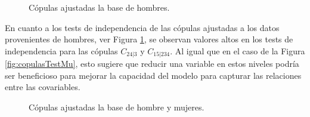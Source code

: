 \begin{figure}[H]
 \centering
    \caption{Cópulas ajustadas la base de hombres.}
    \label{fig:copulasTestHo}
\end{figure}

En cuanto a los tests de independencia de las cópulas ajustadas a los datos provenientes de hombres, ver Figura \ref{fig:copulasTestHo}, se observan valores altos en los tests de independencia para las cópulas $C_{24|3}$ y $C_{15|234}$. Al igual que en el caso de la Figura \ref{fig:copulasTestMu}, esto sugiere que reducir una variable en estos niveles podría ser beneficioso para mejorar la capacidad del modelo para capturar las relaciones entre las covariables. 

\begin{figure}[H]
 \centering
    \caption{Cópulas ajustadas la base de hombre y mujeres.}
    \label{fig:copulasTestTotal}
\end{figure}

